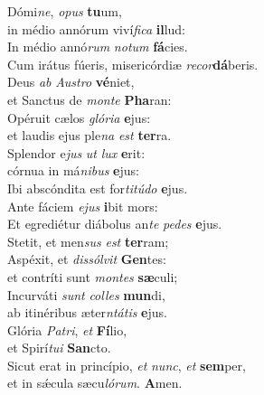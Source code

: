 \evenverse Dómi\textit{ne}, \textit{o}\textit{pus} \textbf{tu}um,~\*\\
\evenverse in médio annórum viví\textit{fi}\textit{ca} \textbf{il}lud:\\
\oddverse In médio annó\textit{rum} \textit{no}\textit{tum} \textbf{fá}cies.~\*\\
\oddverse Cum irátus fúeris, misericórdiæ \textit{re}\textit{cor}\textbf{dá}beris.\\
\evenverse Deus \textit{ab} \textit{Au}\textit{stro} \textbf{vé}niet,~\*\\
\evenverse et Sanctus de \textit{mon}\textit{te} \textbf{Pha}ran:\\
\oddverse Opéruit cælos \textit{gló}\textit{ri}\textit{a} \textbf{e}jus:~\*\\
\oddverse et laudis ejus ple\textit{na} \textit{est} \textbf{ter}ra.\\
\evenverse Splendor e\textit{jus} \textit{ut} \textit{lux} \textbf{e}rit:~\*\\
\evenverse córnua in má\textit{ni}\textit{bus} \textbf{e}jus:\\
\oddverse Ibi abscóndita est for\textit{ti}\textit{tú}\textit{do} \textbf{e}jus.~\*\\
\oddverse Ante fáciem \textit{e}\textit{jus} \textbf{i}bit mors:\\
\evenverse Et egrediétur diábolus an\textit{te} \textit{pe}\textit{des} \textbf{e}jus.~\*\\
\evenverse Stetit, et men\textit{sus} \textit{est} \textbf{ter}ram;\\
\oddverse Aspéxit, et \textit{dis}\textit{sól}\textit{vit} \textbf{Gen}tes:~\*\\
\oddverse et contríti sunt \textit{mon}\textit{tes} \textbf{sæ}culi;\\
\evenverse Incurváti \textit{sunt} \textit{col}\textit{les} \textbf{mun}di,~\*\\
\evenverse ab itinéribus æter\textit{ntá}\textit{tis} \textbf{e}jus.\\
\oddverse Glória \textit{Pa}\textit{tri}, \textit{et} \textbf{Fí}lio,~\*\\
\oddverse et Spirí\textit{tu}\textit{i} \textbf{San}cto.\\
\evenverse Sicut erat in princípio, \textit{et} \textit{nunc}, \textit{et} \textbf{sem}per,~\*\\
\evenverse et in sǽcula sæcu\textit{ló}\textit{rum}. \textbf{A}men.\\
